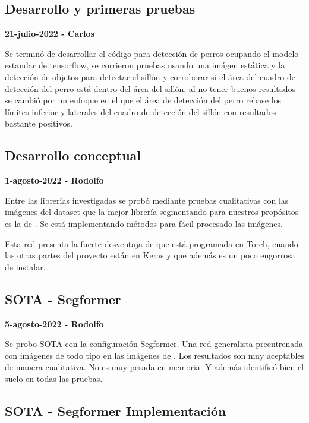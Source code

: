 \subsection*{Desarrollo y primeras pruebas}

\textbf{21-julio-2022 - Carlos}

Se terminó de desarrollar el código para detección de perros ocupando el modelo estandar de tensorflow, se corrieron pruebas usando una imágen estática y la detección de objetos para detectar el sillón y corroborar si el área
del cuadro de detección del perro está dentro del área del sillón, al no tener buenos resultados se cambió por un enfoque en el que el área de detección del perro rebase los límites inferior y laterales del
cuadro de detección del sillón con resultados bastante positivos.


\subsection*{Desarrollo conceptual}


\textbf{1-agosto-2022 - Rodolfo}

Entre las librerías investigadas se probó mediante pruebas cualitativas con las imágenes del dataset que la mejor librería segmentando para nuestros propósitos es la de \textcite{aung2022}. Se está implementando métodos para fácil procesado las imágenes. 

Esta red presenta la fuerte desventaja de que está programada en Torch, cuando las otras partes del proyecto están en Keras y que además es un poco engorrosa de instalar.


\subsection*{SOTA - Segformer}

\textbf{5-agosto-2022 - Rodolfo}

Se probo SOTA con la configuración Segformer. Una red generalista preentrenada con imágenes de todo tipo en las imágenes de \textcite{unity2022}. Los resultados son muy aceptables de manera cualitativa. No es muy pesada en memoria. Y además identificó bien el suelo en todas las pruebas.



\subsection*{SOTA - Segformer Implementación}

